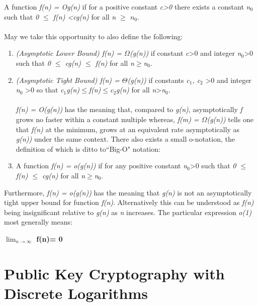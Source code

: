 \documentclass[iwp,first]{luthesis}
\begin{document}
A function \textit{f(n) = Og(n)} if for a positive constant \textit{c\textgreater0} there exists a constant \textit{n$_0$} such that \textit{0 $\leq$ f(n) \textless cg(n)} for all \textit{n $\geq$ $n_0$}.
\\
\\
May we take this opportunity to also define the following:
\begin{enumerate}

\item \textit{(Asymptotic Lower Bound) f(n) = $\Omega$(g(n))} if constant \textit{c}\textgreater0 and integer \textit{n$_0$}\textgreater0 such that \textit{0 $\leq$ cg(n) $\leq$ f(n)} for all \textit{n$\geq$n$_0$}.

\item \textit{(Asymptotic Tight Bound) f(n) = $\Theta$(g(n))} if constants \textit{c$_1$, c$_2$} \textgreater 0 and integer \textit{n$_0$} \textgreater 0 so that \textit{c$_1$g(n)$\leq$f(n)$\leq$c$_2$g(n)} for all \textit{n}\textgreater\textit{n$_0$}. 
\\
\\
\textit{f(n) = O(g(n))} has the meaning that, compared to \textit{g(n)}, asymptotically \textit{f} grows no faster within a constant multiple whereas, \textit{f(m) = $\Omega$(g(n))} tells one that \textit{f(n)} at the minimum, grows at an equivalent rate asymptotically as \textit{g(n))} under the same context. There also exists a small o-notation, the definition of which is ditto to``Big-O" notation:

\item A function \textit{f(n) = o(g(n))} if for any positive constant \textit{n$_0$}\textgreater0 such that \textit{0 $\leq$ f(n) $\leq$ cg(n)} for all \textit{n$\geq$n$_0$}.

\end{enumerate}

Furthermore, \textit{f(n) = o(g(n))} has the meaning that \textit{g(n)} is not an asymptotically tight upper bound for function \textit{f(n)}. Alternatively this can be understood as \textit{f(n)} being insignificant relative to \textit{g(n)} as \textit{n} increases. The particular expression \textit{o(1)} most generally means:

\begin{center}
\textbf{$\lim_{n\to\infty}$ \textbar f(n)\textbar = 0}
\end{center}

\section{Public Key Cryptography with Discrete Logarithms}
\end{document}

